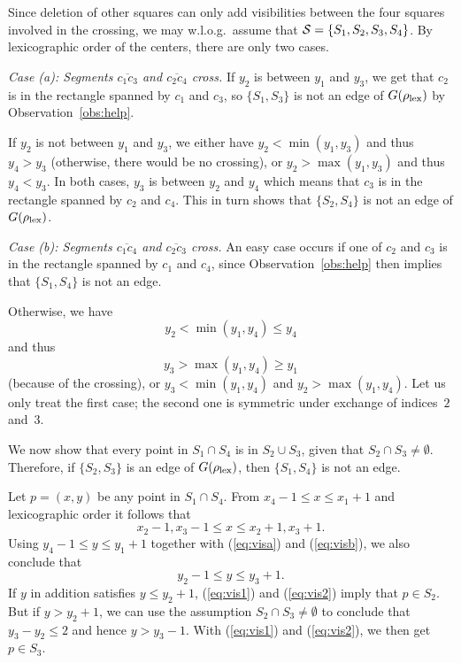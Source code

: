 \documentclass[fleqn,11pt]{article}
\newcommand{\qed}{\hfill\usebox{\proofsymbol}}
\newcommand{\lex}{\rm lex}
\begin{document}
Since deletion of other squares can only add visibilities between the
four squares involved in the crossing, we may w.l.o.g.\
assume that ${\cal S}=\{S_1,S_2,S_3,S_4\}$. By 
lexicographic order of the centers, there are only two
cases.\smallskip

\emph{Case (a): Segments $\overline{c_1c_3}$ and $\overline{c_2c_4}$
  cross.} If $y_2$ is between $y_1$ and $y_3$, we get that
$c_2$ is in the rectangle spanned by $c_1$ and $c_3$, so
$\{S_1,S_3\}$ is not an edge of $G(\rho_{\lex})$ by 
Observation~\ref{obs:help}.


If $y_2$ is not between $y_1$ and $y_3$, we either have
$y_2<\min(y_1,y_3)$ and thus $y_4>y_3$ (otherwise, there
would be no crossing), or $y_2>\max(y_1,y_3)$ and thus $y_4 <
y_3$. In both cases, $y_3$ is between $y_2$ and $y_4$ which
means that $c_3$ is in the rectangle spanned by $c_2$ and $c_4$. This
in turn shows that $\{S_2,S_4\}$ is not an edge of $G(\rho_{\lex})$.
\smallskip

\emph{Case (b): Segments $\overline{c_1c_4}$ and $\overline{c_2c_3}$
  cross.} An easy case occurs if one of
$c_2$ and $c_3$ is in the rectangle spanned by $c_1$ and
$c_4$, since Observation~\ref{obs:help} then implies that
$\{S_1,S_4\}$ is not an edge.

Otherwise, we have 
\begin{equation}\label{eq:visa}
y_2<\min(y_1,y_4)\leq y_4
\end{equation}
and thus 
\begin{equation}\label{eq:visb}
y_3>\max(y_1,y_4)\geq y_1
\end{equation}
(because of the crossing), or $y_3<\min(y_1,y_4)$ and
$y_2>\max(y_1,y_4)$. Let us only treat the first case; the second one
is symmetric under exchange of indices~$2$ and~$3$.

We now show that every point in $S_1\cap S_4$ is in $S_2\cup
S_3$, given that $S_2\cap S_3\neq\emptyset$. Therefore, if
$\{S_2,S_3\}$ is an edge of $G(\rho_{\lex})$, then
$\{S_1,S_4\}$ is not an edge.

Let $p=(x,y)$ be any point in $S_1\cap S_4$. 
From $x_4-1\leq x \leq x_1+1$
and lexicographic order it follows that
\begin{equation}
x_2-1, x_3-1 \leq x \leq x_2+1, x_3+1.\label{eq:vis1}
\end{equation}
Using $y_4-1 \leq y \leq y_1+1$ together with (\ref{eq:visa}) and
(\ref{eq:visb}), we also conclude that
\begin{equation}
y_2-1 \leq y \leq y_3+1.\label{eq:vis2}
\end{equation}
If $y$ in addition satisfies $y\leq y_2+1$, (\ref{eq:vis1}) and
(\ref{eq:vis2}) imply that $p\in S_2$. But if $y>y_2+1$, we can
use the assumption $S_2\cap S_3\neq\emptyset$ to conclude that 
$y_3-y_2\leq 2$ and hence $y>y_3-1$. With (\ref{eq:vis1}) and
(\ref{eq:vis2}), we then get $p\in S_3$.
\qed
\end{document}
